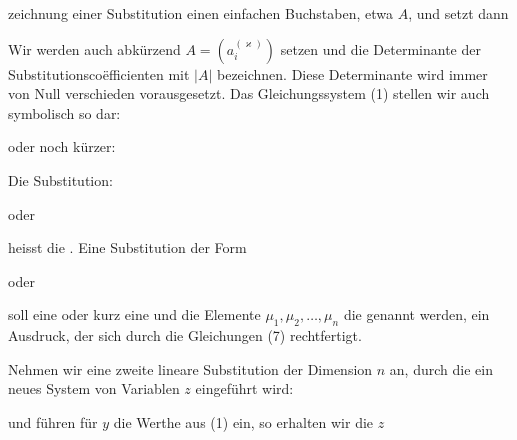 zeichnung einer Substitution einen einfachen Buchstaben, etwa $A$, und setzt dann


Wir werden auch abkürzend $A = (a_i^{(\varkappa)})$ setzen und die Determinante der Substitutionscoëfficienten mit $|A|$ bezeichnen. Diese Determinante wird immer von Null verschieden vorausgesetzt. Das Gleichungssystem (1) stellen wir auch symbolisch so dar:


oder noch kürzer:


Die Substitution:


oder


heisst die . Eine Substitution der Form


oder


soll eine  oder kurz eine  und die Elemente $\mu_1, \mu_2, \dots, \mu_n$ die  genannt werden, ein Ausdruck, der sich durch die Gleichungen (7) rechtfertigt.

Nehmen wir eine zweite lineare Substitution der Dimension $n$ an, durch die ein neues System von Variablen $z$ eingeführt wird:


und führen für $y$ die Werthe aus (1) ein, so erhalten wir die $z$
